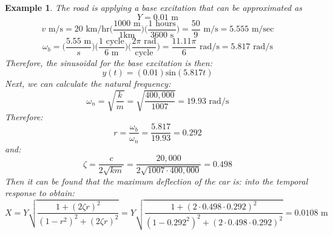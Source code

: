 \documentclass[12pt,letter]{article}
\newtheorem{ex}{Example}
\numberwithin{ex}{section} %
\newenvironment{example}{\begin{mdframed}[middlelinewidth=0.5mm]\begin{ex}\normalfont}{\end{ex}\end{mdframed}}
\begin{document}
\begin{example}
			The road is applying a base excitation that can be approximated as 
			\begin{equation}
				Y = 0.01 \text{ m}
			\end{equation} 				
			\begin{equation}
				v \text{ m/s} = 20 \text{ km/hr}\Bigg(\frac{1000 \text{ m}}{1 \text {km}}\Bigg) \Bigg(\frac{1 \text{ hours}}{3600 \text { s}}\Bigg) = \frac{50}{9} \text{ m/s} = 5.555 \text{ m/sec}
			\end{equation} 	
			\begin{equation}
				\omega_b = \Bigg(\frac{ 5.55 \text{ m}}{s}\Bigg) \Bigg(\frac{ 1 \text{ cycle}}{6 \text{ m}}\Bigg) \Bigg(\frac{ 2 \pi \text{ rad}}{\text {cycle}}\Bigg) = \frac{ 11.11 \pi }{6 } \text{ rad/s} =5.817 \text{ rad/s} 
			\end{equation} 	
			Therefore, the sinusoidal for the base excitation is then:
			\begin{equation}
				y(t) = (0.01) \text{sin}(5.817 t)
			\end{equation} 	
			Next, we can calculate the natural frequency:
			\begin{equation}
				\omega_n = \sqrt{\frac{k}{m}} = \sqrt{\frac{400,000}{1007}} = 19.93 \text{ rad/s}
			\end{equation} 			
			Therefore:
			\begin{equation}
			r=\frac{\omega_b}{\omega_n} = \frac{5.817}{19.93} =0.292
			\end{equation} 		
			and:
			\begin{equation}
			\zeta = \frac{c}{2\sqrt{km}}= \frac{20,000}{2\sqrt{1007\cdot400,000}} = 0.498
			\end{equation}	
			Then it can be found that the maximum deflection of the car is:
			into the temporal response to obtain:
			\begin{equation}
			X = Y \sqrt{\frac{1+(2 \zeta r)^2}{(1-r^2)^2 + (2 \zeta r )^2}} = Y \sqrt{\frac{1+(2 \cdot 0.498 \cdot 0.292)^2}{(1-0.292^2)^2 + (2 \cdot 0.498 \cdot 0.292 )^2}}  = 0.0108 \text{ m}
			\end{equation} 		
\end{example}				
			
\end{document}
